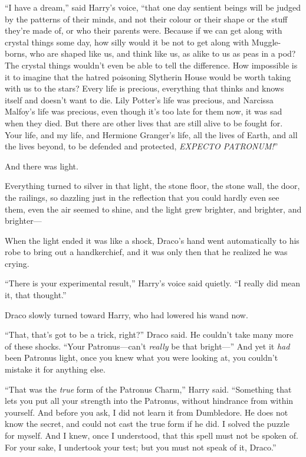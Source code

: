 “I have a dream,” said Harry’s voice, “that one day sentient beings will be judged by the patterns of their minds, and not their colour or their shape or the stuff they’re made of, or who their parents were. Because if we can get along with crystal things some day, how silly would it be not to get along with Muggle-borns, who are shaped like us, and think like us, as alike to us as peas in a pod? The crystal things wouldn’t even be able to tell the difference. How impossible is it to imagine that the hatred poisoning Slytherin House would be worth taking with us to the stars? Every life is precious, everything that thinks and knows itself and doesn’t want to die. Lily Potter’s life was precious, and Narcissa Malfoy’s life was precious, even though it’s too late for them now, it was sad when they died. But there are other lives that are still alive to be fought for. Your life, and my life, and Hermione Granger’s life, all the lives of Earth, and all the lives beyond, to be defended and protected, \emph{EXPECTO PATRONUM!}”

And there was light.

Everything turned to silver in that light, the stone floor, the stone wall, the door, the railings, so dazzling just in the reflection that you could hardly even see them, even the air seemed to shine, and the light grew brighter, and brighter, and brighter—

When the light ended it was like a shock, Draco’s hand went automatically to his robe to bring out a handkerchief, and it was only then that he realized he was crying.

“There is your experimental result,” Harry’s voice said quietly. “I really did mean it, that thought.”

Draco slowly turned toward Harry, who had lowered his wand now.

“That, that’s got to be a trick, right?” Draco said. He couldn’t take many more of these shocks. “Your Patronus—can’t \emph{really} be that bright—” And yet it \emph{had} been Patronus light, once you knew what you were looking at, you couldn’t mistake it for anything else.

“That was the \emph{true} form of the Patronus Charm,” Harry said. “Something that lets you put all your strength into the Patronus, without hindrance from within yourself. And before you ask, I did not learn it from Dumbledore. He does not know the secret, and could not cast the true form if he did. I solved the puzzle for myself. And I knew, once I understood, that this spell must not be spoken of. For your sake, I undertook your test; but you must not speak of it, Draco.”

